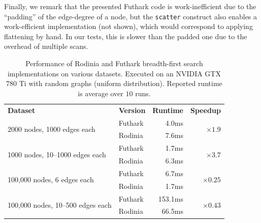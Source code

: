 Finally, we remark that the presented Futhark code is work-inefficient
due to the ``padding'' of the edge-degree of a node, but the
\lstinline{scatter} construct also enables a work-efficient
implementation (not shown), which would correspond to applying
flattening by hand. In our tests, this is slower than the padded one
due to the overhead of multiple scans.
%

\begin{table}
  \centering
  \begin{tabular}{llrr}
    \textbf{Dataset} & \textbf{Version} & \textbf{Runtime} & \textbf{Speedup} \\

    \multirow{2}{*}{2000 nodes, 1000 edges each} & Futhark & 4.0ms & \multirow{2}{*}{$\times1.9$} \\\cline{2-3}
                     & Rodinia & 7.6ms \\\hline

    \multirow{2}{*}{1000 nodes, 10--1000 edges each} & Futhark & 1.7ms & \multirow{2}{*}{$\times3.7$} \\\cline{2-3}
                     & Rodinia & 6.3ms \\\hline

    \multirow{2}{*}{100,000 nodes, 6 edges each} & Futhark & 6.7ms & \multirow{2}{*}{$\times0.25$} \\\cline{2-3}
                     & Rodinia & 1.7ms \\\hline

    \multirow{2}{*}{100,000 nodes, 10--500 edges each} & Futhark & 153.1ms & \multirow{2}{*}{$\times0.43$} \\\cline{2-3}
                     & Rodinia & 66.5ms \\\hline

  \end{tabular}
  \caption{Performance of Rodinia and Futhark breadth-first search
    implementations on various datasets. Executed on an NVIDIA GTX 780
    Ti with random graphs (uniform distribution).  Reported runtime is
    average over $10$ runs.}
  \label{fig:bfs-speedup}
\end{table}

